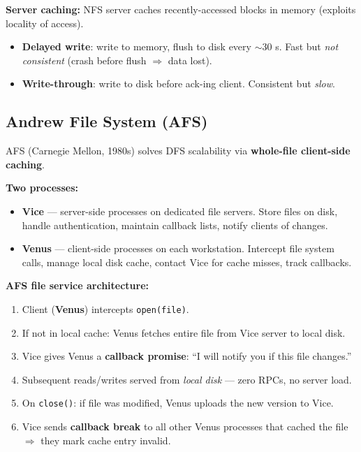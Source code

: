 \documentclass[12pt,a4paper]{article}
\begin{document}
\textbf{Server caching:} NFS server caches recently-accessed blocks in memory (exploits locality of access).
\begin{itemize}[noitemsep]
  \item \textbf{Delayed write}: write to memory, flush to disk every $\sim$30 s. Fast but \emph{not consistent} (crash before flush $\Rightarrow$ data lost).
  \item \textbf{Write-through}: write to disk before ack-ing client. Consistent but \emph{slow}.
\end{itemize}

\subsection{Andrew File System (AFS)}

AFS (Carnegie Mellon, 1980s) solves DFS scalability via \textbf{whole-file client-side caching}.

\textbf{Two processes:}
\begin{itemize}[noitemsep]
  \item \textbf{Vice} --- server-side processes on dedicated file servers. Store files on disk, handle authentication, maintain callback lists, notify clients of changes.
  \item \textbf{Venus} --- client-side processes on each workstation. Intercept file system calls, manage local disk cache, contact Vice for cache misses, track callbacks.
\end{itemize}

\textbf{AFS file service architecture:}
\begin{enumerate}[noitemsep]
  \item Client (\textbf{Venus}) intercepts \texttt{open(file)}.
  \item If not in local cache: Venus fetches entire file from Vice server to local disk.
  \item Vice gives Venus a \textbf{callback promise}: ``I will notify you if this file changes.''
  \item Subsequent reads/writes served from \emph{local disk} --- zero RPCs, no server load.
  \item On \texttt{close()}: if file was modified, Venus uploads the new version to Vice.
  \item Vice sends \textbf{callback break} to all other Venus processes that cached the file $\Rightarrow$ they mark cache entry invalid.
\end{enumerate}
\end{document}

